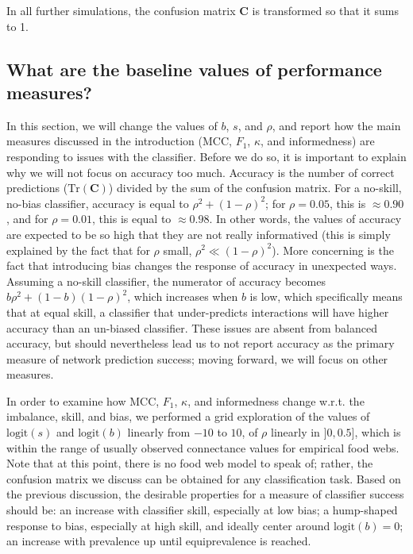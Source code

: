 \documentclass[10pt,oneside]{article}
\begin{document}
In all further simulations, the confusion matrix \(\mathbf{C}\) is
transformed so that it sums to 1.

\hypertarget{what-are-the-baseline-values-of-performance-measures}{%
\subsection{What are the baseline values of performance
measures?}\label{what-are-the-baseline-values-of-performance-measures}}

In this section, we will change the values of \(b\), \(s\), and
\(\rho\), and report how the main measures discussed in the introduction
(MCC, \(F_1\), \(\kappa\), and informedness) are responding to issues
with the classifier. Before we do so, it is important to explain why we
will not focus on accuracy too much. Accuracy is the number of correct
predictions (\(\text{Tr}(\mathbf{C})\)) divided by the sum of the
confusion matrix. For a no-skill, no-bias classifier, accuracy is equal
to \(\rho^2 + (1-\rho)^2\); for \(\rho = 0.05\), this is
\(\approx 0.90\), and for \(\rho = 0.01\), this is equal to
\(\approx 0.98\). In other words, the values of accuracy are expected to
be so high that they are not really informatived (this is simply
explained by the fact that for \(\rho\) small,
\(\rho^2 \ll (1-\rho)^2\)). More concerning is the fact that introducing
bias changes the response of accuracy in unexpected ways. Assuming a
no-skill classifier, the numerator of accuracy becomes
\(b\rho^2 + (1-b)(1-\rho)^2\), which increases when \(b\) is low, which
specifically means that at equal skill, a classifier that under-predicts
interactions will have higher accuracy than an un-biased classifier.
These issues are absent from balanced accuracy, but should nevertheless
lead us to not report accuracy as the primary measure of network
prediction success; moving forward, we will focus on other measures.

In order to examine how MCC, \(F_1\), \(\kappa\), and informedness
change w.r.t. the imbalance, skill, and bias, we performed a grid
exploration of the values of \(\text{logit}(s)\) and \(\text{logit}(b)\)
linearly from \(-10\) to \(10\), of \(\rho\) linearly in \(]0, 0.5]\),
which is within the range of usually observed connectance values for
empirical food webs. Note that at this point, there is no food web model
to speak of; rather, the confusion matrix we discuss can be obtained for
any classification task. Based on the previous discussion, the desirable
properties for a measure of classifier success should be: an increase
with classifier skill, especially at low bias; a hump-shaped response to
bias, especially at high skill, and ideally center around
\(\text{logit}(b)=0\); an increase with prevalence up until
equiprevalence is reached.
\end{document}
